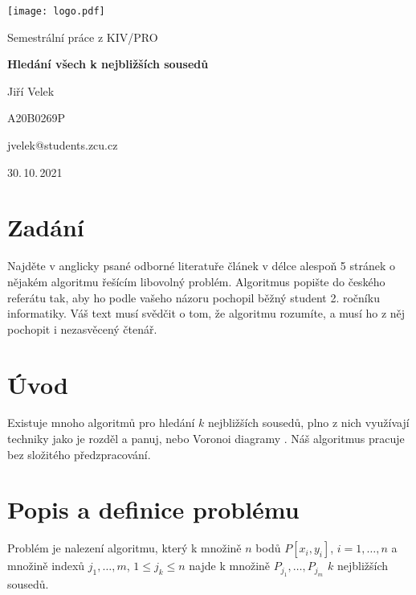 \documentclass[
12pt,
a4paper,
pdftex,
czech,
titlepage
]{report}
\author{Jiří Velek}
\date{30. 10. 2021}
\begin{document}
\begin{titlepage}
	\vspace*{-2cm}
	{\centering\texttt{[image: logo.pdf]}\par}
	\centering
	\vspace*{2cm}
	{\Large Semestrální práce z KIV/PRO\par}
	\vspace{1.5cm}
	{\Huge\bfseries Hledání všech k nejbližších sousedů\par}
	\vspace{2cm}

	{\Large Jiří Velek\par}
	{\Large A20B0269P\par}
	{\Large jvelek@students.zcu.cz\par}

	\vfill

	{\Large 30.\,10.\,2021}
\end{titlepage}

\hypertarget{zaduxe1nuxed}{%
\chapter{Zadání}\label{zaduxe1nuxed}}

Najděte v anglicky psané odborné literatuře článek v délce alespoň 5
stránek o nějakém
algoritmu řešícím libovolný problém. Algoritmus popište do českého
referátu tak, aby ho
podle vašeho názoru pochopil běžný student 2. ročníku informatiky. Váš
text musí svědčit o tom, že algoritmu rozumíte, a musí ho z něj pochopit
i nezasvěcený čtenář.

\hypertarget{uxfavod}{%
\chapter{Úvod}\label{uxfavod}}

Existuje mnoho algoritmů pro hledání \(k\) nejbližších sousedů, plno z
nich využívají techniky jako je rozděl a panuj, nebo Voronoi diagramy \cite{edelsbrunner, rourke, preparatafp}.
Náš algoritmus pracuje bez složitého předzpracování.

\hypertarget{popis-a-definice-probluxe9mu}{%
\chapter{Popis a definice problému}\label{popis-a-definice-probluxe9mu}}

Problém je nalezení algoritmu, který k množině \(n\) bodů
\(P[x_i, y_i]\), \(i = 1,\ldots{,n}\) a množině indexů
\(j_1,\ldots{,m}\), \(1 \leq{j_k} \leq{n}\) najde k množině
\(P_{j_{1}},\ldots,{P_{j_{m}}}\) \(k\) nejbližších sousedů.
\end{document}
